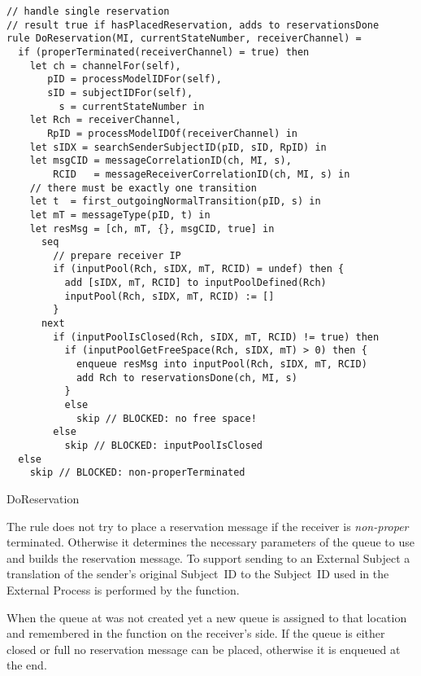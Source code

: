 \begin{listing}[htbp]
\begin{verbatim}
// handle single reservation
// result true if hasPlacedReservation, adds to reservationsDone
rule DoReservation(MI, currentStateNumber, receiverChannel) =
  if (properTerminated(receiverChannel) = true) then
    let ch = channelFor(self),
       pID = processModelIDFor(self),
       sID = subjectIDFor(self),
         s = currentStateNumber in
    let Rch = receiverChannel,
       RpID = processModelIDOf(receiverChannel) in
    let sIDX = searchSenderSubjectID(pID, sID, RpID) in
    let msgCID = messageCorrelationID(ch, MI, s),
        RCID   = messageReceiverCorrelationID(ch, MI, s) in
    // there must be exactly one transition
    let t  = first_outgoingNormalTransition(pID, s) in
    let mT = messageType(pID, t) in
    let resMsg = [ch, mT, {}, msgCID, true] in
      seq
        // prepare receiver IP
        if (inputPool(Rch, sIDX, mT, RCID) = undef) then {
          add [sIDX, mT, RCID] to inputPoolDefined(Rch)
          inputPool(Rch, sIDX, mT, RCID) := []
        }
      next
        if (inputPoolIsClosed(Rch, sIDX, mT, RCID) != true) then
          if (inputPoolGetFreeSpace(Rch, sIDX, mT) > 0) then {
            enqueue resMsg into inputPool(Rch, sIDX, mT, RCID)
            add Rch to reservationsDone(ch, MI, s)
          }
          else
            skip // BLOCKED: no free space!
        else
          skip // BLOCKED: inputPoolIsClosed
  else
    skip // BLOCKED: non-properTerminated
\end{verbatim}
\caption{DoReservation}
\label{lst:shortasm:DoReservation}
\end{listing}


The  rule does not try to place a reservation message if the receiver is \textit{non-proper} terminated. Otherwise it determines the necessary parameters of the queue to use and builds the reservation message. To support sending to an External Subject a translation of the sender's original Subject~ID to the Subject~ID used in the External Process is performed by the  function.

When the queue at  was not created yet a new queue is assigned to that location and remembered in the  function on the receiver's side. If the queue is either closed or full no reservation message can be placed, otherwise it is enqueued at the end.


